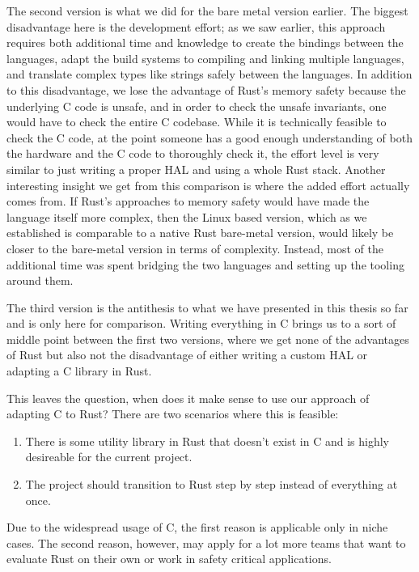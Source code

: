 The second version is what we did for the bare metal version earlier.
The biggest disadvantage here is the development effort;
as we saw earlier, this approach requires both additional time and knowledge to create the bindings between the languages,
adapt the build systems to compiling and linking multiple languages, and translate complex types like strings safely between the languages.
In addition to this disadvantage, we lose the advantage of Rust's memory safety
because the underlying C code is unsafe, and in order to check the unsafe invariants, one would have to check the entire C codebase.
While it is technically feasible to check the C code,
at the point someone has a good enough understanding of both the hardware and the C code to thoroughly check it,
the effort level is very similar to just writing a proper HAL and using a whole Rust stack.
Another interesting insight we get from this comparison is where the added effort actually comes from.
If Rust's approaches to memory safety would have made the language itself more complex,
then the Linux based version,
which as we established is comparable to a native Rust bare-metal version,
would likely be closer to the bare-metal version in terms of complexity.
Instead, most of the additional time was spent bridging the two languages and setting up the tooling around them.

The third version is the antithesis to what we have presented in this thesis so far and is only here for comparison.
Writing everything in C brings us to a sort of middle point between the first two versions, where
we get none of the advantages of Rust
but also not the disadvantage of either writing a custom HAL or adapting a C library in Rust.

This leaves the question, when does it make sense to use our approach of adapting C to Rust?
There are two scenarios where this is feasible:
\begin{enumerate}
    \item There is some utility library in Rust that doesn't exist in C and is highly desireable for the current project.
    \item The project should transition to Rust step by step instead of everything at once.
\end{enumerate}

Due to the widespread usage of C, the first reason is applicable only in niche cases.
The second reason, however, may apply for a lot more teams that want to evaluate Rust on their own or work in safety critical applications.